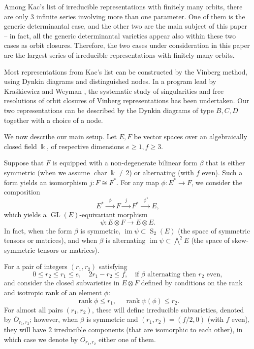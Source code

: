 \documentclass[11pt]{amsart}
\numberwithin{equation}{section}
\theoremstyle{definition}
\newcommand{\Hom}{\operatorname{Hom}}
\DeclareMathOperator{\rank}{rank}
\DeclareMathOperator{\GL}{GL}
\DeclareMathOperator{\cha}{char}
\newcommand{\op}{\operatorname}
\newcommand{\oo}{\otimes}
\newcommand{\ol}{\overline}
\newcommand{\kk}{\Bbbk}
\begin{document}
Among Kac's list of irreducible representations with finitely many orbits, there are only $3$ infinite series involving more than one parameter. One of them is the generic determinantal case, and the other two are the main subject of this paper  -- in fact, all the generic determinantal varieties appear also within these two cases as orbit closures. Therefore, the two cases under consideration in this paper are the largest series of irreducible representations with finitely many orbits.

Most representations from Kac's list can be constructed by the Vinberg method, using Dynkin diagrams and distinguished nodes. In a program lead by Kra\'skiewicz and Weyman \cite{kraswey1, kraswey2}, the systematic study of singularities and free resolutions of orbit closures of Vinberg representations has been undertaken. Our two representations can be described by the Dynkin diagrams of type $B, C, D$ together with a choice of a node.


\bigskip

We now describe our main setup. Let $E, F$ be vector spaces over an algebraically closed field $\kk$, of respective dimensions $e\geq 1, f \geq 3$. %

Suppose that $F$ is equipped with a non-degenerate bilinear form $\beta$ that is either symmetric (when we assume $\cha \kk \neq 2$) or alternating (with $f$ even). Such a form yields an isomorphism $j: F \cong F^*$. For any map $\phi: E^* \to F$, we consider the composition
\[
 E^* \xrightarrow{\;\; \phi \;\;} F \xrightarrow{\;\; j \;\;} F^* \xrightarrow{\;\; \phi^* \;} E,
 \]
 which yields a $\GL(E)$-equivariant morphism 
 \begin{equation}\label{eq:psi}
 \psi: E\oo F \to E\oo E.
\end{equation}
In fact, when the form $\beta$ is symmetric, $\op{im} \psi \subset \op{S}_2(E)$ (the space of symmetric tensors or matrices), and when $\beta$ is alternating $\op{im} \psi \subset \bigwedge^2 E$ (the space of skew-symmetric tensors or matrices).
 
For a pair of integers $(r_1,r_2)$ satisfying 
\begin{equation}\label{eq:condi}
0\leq r_2 \leq r_1 \leq e,  \quad 2 r_1 - r_2 \leq f, \quad \mbox{if } \beta \mbox{ alternating then } r_2 \mbox{ even},
\end{equation}
and consider the closed subvarieties in $E\oo F$ defined by conditions on the rank and isotropic rank of an element $\phi$:
\begin{equation}\label{eq:rank}
\rank \phi \leq r_1, \quad \,\rank \psi(\phi) \leq r_2.
\end{equation}
For almost all pairs $(r_1,r_2)$, these will define irreducible subvarieties, denoted by $\ol{O}_{r_1,r_2}$; however, when $\beta$ is symmetric and $(r_1, r_2) = (f/2, 0)$ (with $f$ even), they will have $2$ irreducible components (that are isomorphic to each other), in which case we denote by $\ol{O}_{r_1,r_2}$ either one of them. %
 
\end{document}
